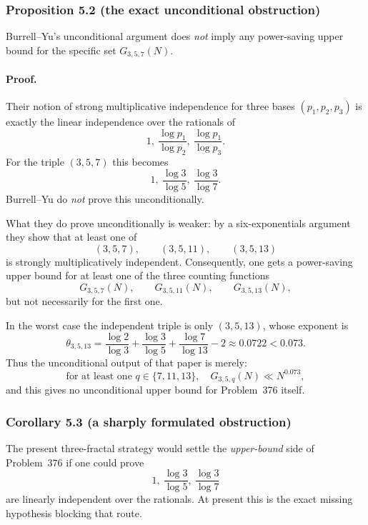 \subsubsection*{Proposition 5.2 (the exact unconditional obstruction)}
Burrell--Yu's unconditional argument does \emph{not} imply any power-saving upper bound for the specific set $G_{3,5,7}(N)$.

\paragraph{Proof.}
Their notion of strong multiplicative independence for three bases $(p_1,p_2,p_3)$ is exactly the linear independence over the rationals of
\[
1,\ \frac{\log p_1}{\log p_2},\ \frac{\log p_1}{\log p_3}.
\]
For the triple $(3,5,7)$ this becomes
\[
1,\ \frac{\log 3}{\log 5},\ \frac{\log 3}{\log 7}.
\]
Burrell--Yu do \emph{not} prove this unconditionally.

What they do prove unconditionally is weaker: by a six-exponentials argument they show that at least one of
\[
(3,5,7),\qquad (3,5,11),\qquad (3,5,13)
\]
is strongly multiplicatively independent.
Consequently, one gets a power-saving upper bound for at least one of the three counting functions
\[
G_{3,5,7}(N),\qquad G_{3,5,11}(N),\qquad G_{3,5,13}(N),
\]
but not necessarily for the first one.

In the worst case the independent triple is only $(3,5,13)$, whose exponent is
\[
\theta_{3,5,13}
=
\frac{\log 2}{\log 3}+\frac{\log 3}{\log 5}+\frac{\log 7}{\log 13}-2
\approx 0.0722<0.073.
\]
Thus the unconditional output of that paper is merely:
\[
\text{for at least one } q\in\{7,11,13\},\quad G_{3,5,q}(N)\ll N^{0.073},
\]
and this gives no unconditional upper bound for Problem~376 itself.

\subsubsection*{Corollary 5.3 (a sharply formulated obstruction)}
The present three-fractal strategy would settle the \emph{upper-bound} side of Problem~376 if one could prove
\[
1,\ \frac{\log 3}{\log 5},\ \frac{\log 3}{\log 7}
\]
are linearly independent over the rationals.
At present this is the exact missing hypothesis blocking that route.

